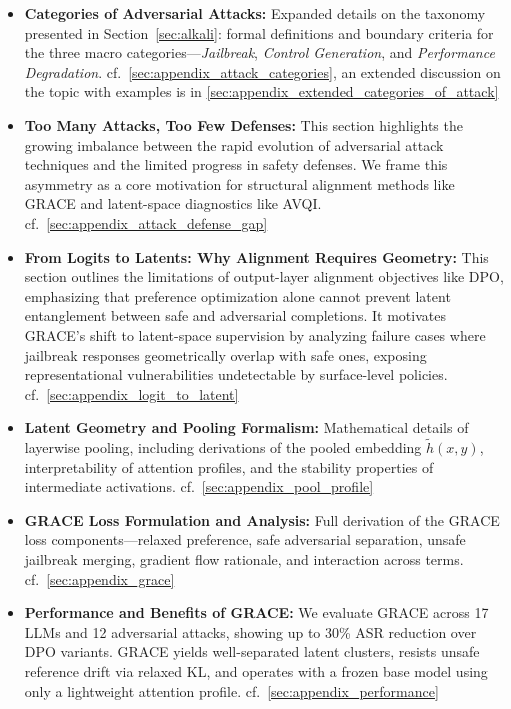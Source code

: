 \begin{itemize}

    \item \textbf{Categories of Adversarial Attacks:}  
    Expanded details on the taxonomy presented in Section~\ref{sec:alkali}: formal definitions and boundary criteria for the three macro categories—\textit{Jailbreak}, \textit{Control Generation}, and \textit{Performance Degradation}.  cf.~\cref{sec:appendix_attack_categories}, an extended discussion on the topic with examples is in \cref{sec:appendix_extended_categories_of_attack}

    \item \textbf{Too Many Attacks, Too Few Defenses:}  
    This section highlights the growing imbalance between the rapid evolution of adversarial attack techniques and the limited progress in safety defenses. We frame this asymmetry as a core motivation for structural alignment methods like GRACE and latent-space diagnostics like AVQI. cf.~\cref{sec:appendix_attack_defense_gap}

    \item \textbf{From Logits to Latents: Why Alignment Requires Geometry:}  
    This section outlines the limitations of output-layer alignment objectives like DPO, emphasizing that preference optimization alone cannot prevent latent entanglement between safe and adversarial completions. It motivates GRACE's shift to latent-space supervision by analyzing failure cases where jailbreak responses geometrically overlap with safe ones, exposing representational vulnerabilities undetectable by surface-level policies. cf.~\cref{sec:appendix_logit_to_latent}
    
    \item \textbf{Latent Geometry and Pooling Formalism:}  
    Mathematical details of layerwise pooling, including derivations of the pooled embedding $\tilde{h}(x, y)$, interpretability of attention profiles, and the stability properties of intermediate activations. cf.~\cref{sec:appendix_pool_profile}

    \item \textbf{GRACE Loss Formulation and Analysis:}  
    Full derivation of the GRACE loss components—relaxed preference, safe adversarial separation, unsafe jailbreak merging, gradient flow rationale, and interaction across terms. cf.~\cref{sec:appendix_grace}

    \item \textbf{Performance and Benefits of \textsc{GRACE}:}  
    We evaluate \textsc{GRACE} across 17 LLMs and 12 adversarial attacks, showing up to 30\% ASR reduction over DPO variants. GRACE yields well-separated latent clusters, resists unsafe reference drift via relaxed KL, and operates with a frozen base model using only a lightweight attention profile. cf.~\cref{sec:appendix_performance}


\end{itemize}
